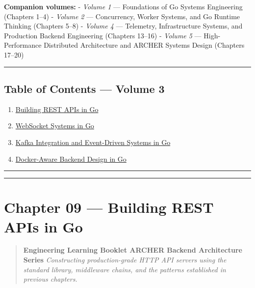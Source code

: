 \documentclass[
]{article}
\providecommand{\tightlist}{%
  \setlength{\itemsep}{0pt}\setlength{\parskip}{0pt}}
\begin{document}
\textbf{Companion volumes:} - \emph{Volume 1} --- Foundations of Go
Systems Engineering (Chapters 1--4) - \emph{Volume 2} --- Concurrency,
Worker Systems, and Go Runtime Thinking (Chapters 5--8) - \emph{Volume
4} --- Telemetry, Infrastructure Systems, and Production Backend
Engineering (Chapters 13--16) - \emph{Volume 5} --- High-Performance
Distributed Architecture and ARCHER Systems Design (Chapters 17--20)

\begin{center}\rule{0.5\linewidth}{0.5pt}\end{center}

\hypertarget{table-of-contents-volume-3}{%
\subsection{Table of Contents --- Volume
3}\label{table-of-contents-volume-3}}

\begin{enumerate}
\def\labelenumi{\arabic{enumi}.}
\setcounter{enumi}{8}
\tightlist
\item
  \protect\hyperlink{chapter-09--building-rest-apis-in-go}{Building REST
  APIs in Go}
\item
  \protect\hyperlink{chapter-10--websocket-systems-in-go}{WebSocket
  Systems in Go}
\item
  \protect\hyperlink{chapter-11--kafka-integration-and-event-driven-systems-in-go}{Kafka
  Integration and Event-Driven Systems in Go}
\item
  \protect\hyperlink{chapter-12--docker-aware-backend-design-in-go}{Docker-Aware
  Backend Design in Go}
\end{enumerate}

\begin{center}\rule{0.5\linewidth}{0.5pt}\end{center}

\begin{center}\rule{0.5\linewidth}{0.5pt}\end{center}

\hypertarget{chapter-09-building-rest-apis-in-go}{%
\section{Chapter 09 --- Building REST APIs in
Go}\label{chapter-09-building-rest-apis-in-go}}

\begin{quote}
\textbf{Engineering Learning Booklet \textbar{} ARCHER Backend
Architecture Series} \emph{Constructing production-grade HTTP API
servers using the standard library, middleware chains, and the patterns
established in previous chapters.}
\end{quote}
\end{document}
